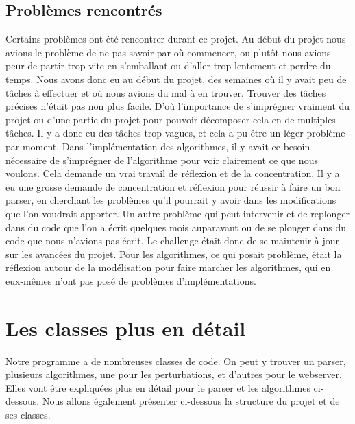 \documentclass[french, 12pt]{article}
\begin{document}
\subsection{Problèmes rencontrés}
Certains problèmes ont été rencontrer durant ce projet.
Au début du projet nous avions le problème de ne pas savoir par où commencer, ou plutôt nous avions peur de partir trop vite en s'emballant ou d'aller trop lentement et perdre du temps. Nous avons donc eu au début du projet, des semaines où il y avait peu de tâches à effectuer et où nous avions du mal à en trouver. Trouver des tâches précises n'était pas non plus facile.
D'où l'importance de s'imprégner vraiment du projet ou d'une partie du projet pour pouvoir décomposer cela en de multiples tâches. Il y a donc eu des tâches trop vagues, et cela a pu être un léger problème par moment. Dans l'implémentation des algorithmes, il y avait ce besoin nécessaire de s'imprégner de l'algorithme pour voir clairement ce que nous voulons. Cela demande un vrai travail de réflexion et de la concentration. Il y a eu une grosse demande de concentration et réflexion pour réussir à faire un bon parser, en cherchant les problèmes qu'il pourrait y avoir dans les modifications que l'on voudrait apporter.
Un autre problème qui peut intervenir et de replonger dans du code que l'on a écrit quelques mois auparavant ou de se plonger dans du code que nous n'avions pas écrit. Le challenge était donc de se maintenir à jour sur les avancées du projet.
Pour les algorithmes, ce qui posait problème, était la réflexion autour de la modélisation pour faire marcher les algorithmes, qui en eux-mêmes n'ont pas posé de problèmes d'implémentations.


\newpage
\section{Les classes plus en détail}
Notre programme a de nombreuses classes de code. On peut y trouver un parser, plusieurs algorithmes, une pour les perturbations, et d'autres pour le webserver. Elles vont être expliquées plus en détail pour le parser et les algorithmes ci-dessous. Nous allons également présenter ci-dessous la structure du projet et de ses classes.
\end{document}
